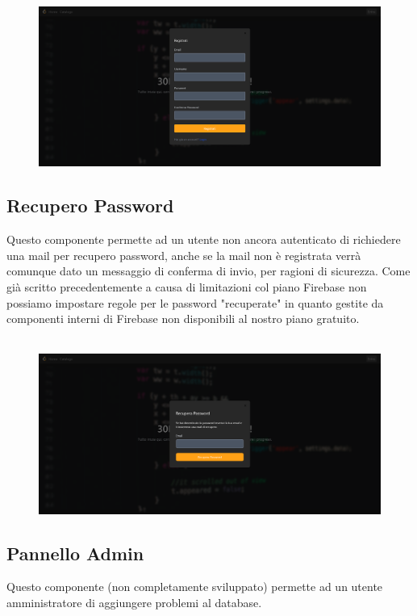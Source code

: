 \documentclass[11pt, a4paper]{article}
\theoremstyle{definition}
\begin{document}
\begin{figure}[H]
  \centering
  \includegraphics[width=\textwidth]{materiale/sito/Signup.png}
\end{figure}

\subsection{Recupero Password}
Questo componente permette ad un utente non ancora autenticato di richiedere una mail per recupero password, anche se la mail non è registrata verrà comunque dato un messaggio di conferma di invio, per ragioni di sicurezza. Come già scritto precedentemente
a causa di limitazioni col piano Firebase non possiamo impostare regole per le password "recuperate" in quanto gestite da componenti interni di Firebase non disponibili al nostro piano gratuito.\\\\

\begin{figure}[H]
  \centering
  \includegraphics[width=\textwidth]{materiale/sito/Recupero Pw.png}
\end{figure}

\subsection{Pannello Admin}
Questo componente (non completamente sviluppato) permette ad un utente amministratore di aggiungere problemi al database.
\end{document}
